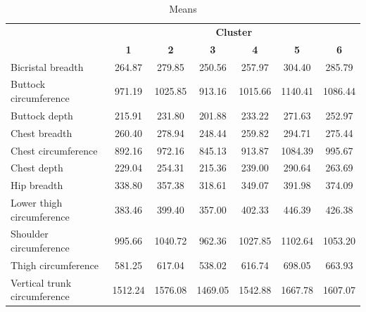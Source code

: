 \documentclass[12pt,a4paper,openany,UKenglish]{scrreprt}
\begin{document}
\begin{table}[H]
	\footnotesize
	\centering
	\caption{Means}
	\begin{tabular}{lcccccc}
		\cline{2-7}
		                             & \multicolumn{6}{c}{\textbf{Cluster}}                                                                            \\
		                             & \textbf{1}                           & \textbf{2}   & \textbf{3}   & \textbf{4}   & \textbf{5}   & \textbf{6}   \\
		\hline\hline
		Bicristal breadth            & 264.87                               & 279.85       & 250.56       & 257.97       & 304.40       & 285.79       \\
		Buttock circumference        & 971.19                               & 1025.85      & 913.16       & 1015.66      & 1140.41      & 1086.44      \\
		Buttock depth                & 215.91                               & 231.80       & 201.88       & 233.22       & 271.63       & 252.97       \\
		Chest breadth                & 260.40                               & 278.94       & 248.44       & 259.82       & 294.71       & 275.44       \\
		Chest circumference          & 892.16                               & 972.16       & 845.13       & 913.87       & 1084.39      & 995.67       \\
		Chest depth                  & 229.04                               & 254.31       & 215.36       & 239.00       & 290.64       & 263.69       \\
		Hip breadth                  & 338.80                               & 357.38       & 318.61       & 349.07       & 391.98       & 374.09       \\
		Lower thigh circumference    & 383.46                               & 399.40       & 357.00       & 402.33       & 446.39       & 426.38       \\
		Shoulder circumference       & 995.66                               & 1040.72      & 962.36       & 1027.85      & 1102.64      & 1053.20      \\
		Thigh circumference          & 581.25                               & 617.04       & 538.02       & 616.74       & 698.05       & 663.93       \\
		Vertical trunk circumference & 1512.24                              & 1576.08      & 1469.05      & 1542.88      & 1667.78      & 1607.07      \\

\end{tabular}
\end{table}
\end{document}
